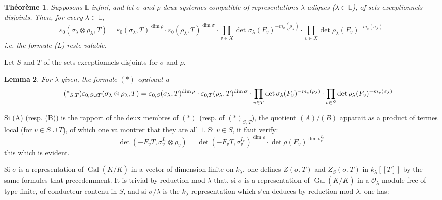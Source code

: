 \documentclass[11pt,a4paper]{article}
\theoremstyle{plain}
\newtheorem{theorem}{Th\'eor\`eme}
\newtheorem{lemma}[theorem]{Lemma}
\DeclareMathOperator{\Gal}{Gal}
\begin{document}
\begin{theorem}
Supposons $\mathbb{L}$ infini, and let $\sigma$ and $\rho$ deux systemes compatible of representations $\lambda$-adiques ($\lambda \in \mathbb{L}$), of sets exceptionnels disjoints. Then, for every $\lambda \in \mathbb{L}$,
\begin{equation}\tag{*}
\varepsilon_0(\sigma_\lambda \otimes \rho_\lambda, T) = \varepsilon_0(\sigma_\lambda, T)^{\dim \rho} \cdot \varepsilon_0(\rho_\lambda, T)^{\dim \sigma} \cdot \prod_{v \in X} \det \sigma_\lambda(F_v)^{-m_v(\rho_\lambda)} \cdot \prod_{v \in X} \det \rho_\lambda(F_v)^{-m_v(\sigma_\lambda)}
\end{equation}
i.e. the formule (L) reste valable.
\end{theorem}

\smallskip

Let $S$ and $T$ of the sets exceptionnels disjoints for $\sigma$ and $\rho$.

\begin{lemma}
For $\lambda$ given, the formule $(*)$ equivaut a
\begin{equation}\tag{*$_{S,T}$}
\varepsilon_{0,S \cup T}(\sigma_\lambda \otimes \rho_\lambda, T) = \varepsilon_{0,S}(\sigma_\lambda, T)^{\dim \rho} \cdot \varepsilon_{0,T}(\rho_\lambda, T)^{\dim \sigma} \cdot \prod_{v \in T} \det \sigma_\lambda(F_v)^{-m_v(\rho_\lambda)} \cdot \prod_{v \in S} \det \rho_\lambda(F_v)^{-m_v(\sigma_\lambda)}
\end{equation}
\end{lemma}

Si (A) (resp. (B)) is the rapport of the deux membres of $(*)$ (resp. of $(*)_{S,T}$), the quotient $(A)/(B)$ apparait as a product of termes local (for $v \in S \cup T$), of which one va montrer that they are all $1$. Si $v \in S$, it faut verify:
\[
\det(-F_v T, \sigma_v^{I_v} \otimes \rho_v) = \det(-F_v T, \sigma_v^{I_v})^{\dim \rho} \cdot \det \rho(F_v)^{\dim \sigma_v^{I_v}}
\]
this which is evident.

Si $\sigma$ is a representation of $\Gal(\overline{K}/K)$ in a vector of dimension finite on $k_\lambda$, one defines $Z(\sigma, T)$ and $Z_S(\sigma, T)$ in $k_\lambda[[T]]$ by the same formules that precedemment. It is trivial by reduction mod $\lambda$ that, si $\sigma$ is a representation of $\Gal(\overline{K}/K)$ in a $\mathcal{O}_\lambda$-module free of type finite, of conducteur contenu in $S$, and si $\sigma/\lambda$ is the $k_\lambda$-representation which s'en deduces by reduction mod $\lambda$, one has:
\end{document}

